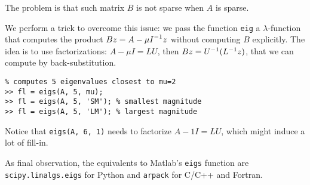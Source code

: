 \documentclass[ComputationalMathematics.tex]{subfiles}
\begin{document}
The problem is that such matrix $B$ is not sparse when $A$ is sparse.

We perform a trick to overcome this issue: we pass the function \texttt{eig} a $\lambda$-function that computes the product $Bz = {A - \mu I}^{-1} z$ without computing $B$ explicitly.
The idea is to use factorizations: $A - \mu I = LU$, then $Bz = {U}^{-1} ({L}^{-1}z)$, that we can compute by back-substitution.

\begin{verbatim}
% computes 5 eigenvalues closest to mu=2
>> fl = eigs(A, 5, mu);
>> fl = eigs(A, 5, 'SM'); % smallest magnitude
>> fl = eigs(A, 5, 'LM'); % largest magnitude
\end{verbatim}

Notice that \texttt{eigs(A, 6, 1)} needs to factorize $A - 1 I = LU$, which might induce a lot of fill-in.

As final observation, the equivalents to Matlab's \texttt{eigs} function are \texttt{scipy.linalgs.eigs} for Python and \texttt{arpack} for C/C++ and Fortran.
\end{document}
